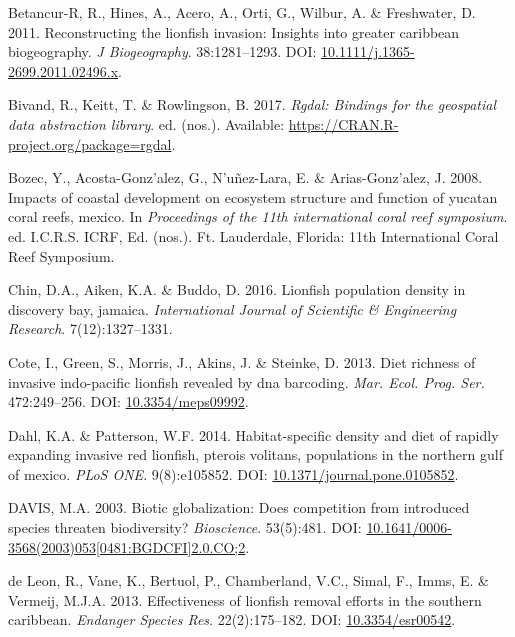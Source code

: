 \documentclass[12pt,]{article}
\begin{document}
\hypertarget{ref-betancurr_2011}{}
Betancur-R, R., Hines, A., Acero, A., Orti, G., Wilbur, A. \&
Freshwater, D. 2011. Reconstructing the lionfish invasion: Insights into
greater caribbean biogeography. \emph{J Biogeography}. 38:1281--1293.
DOI:
\href{https://doi.org/10.1111/j.1365-2699.2011.02496.x}{10.1111/j.1365-2699.2011.02496.x}.

\hypertarget{ref-rgdal_2017}{}
Bivand, R., Keitt, T. \& Rowlingson, B. 2017. \emph{Rgdal: Bindings for
the geospatial data abstraction library}. ed. (nos.). Available:
\url{https://CRAN.R-project.org/package=rgdal}.

\hypertarget{ref-bozec_2008}{}
Bozec, Y., Acosta-Gonz\a'alez, G., N\a'uñez-Lara, E. \&
Arias-Gonz\a'alez, J. 2008. Impacts of coastal development on ecosystem
structure and function of yucatan coral reefs, mexico. In
\emph{Proceedings of the 11th international coral reef symposium}. ed.
I.C.R.S. ICRF, Ed. (nos.). Ft. Lauderdale, Florida: 11th International
Coral Reef Symposium.

\hypertarget{ref-chin_2016}{}
Chin, D.A., Aiken, K.A. \& Buddo, D. 2016. Lionfish population density
in discovery bay, jamaica. \emph{International Journal of Scientific \&
Engineering Research}. 7(12):1327--1331.

\hypertarget{ref-cote_2013}{}
Cote, I., Green, S., Morris, J., Akins, J. \& Steinke, D. 2013. Diet
richness of invasive indo-pacific lionfish revealed by dna barcoding.
\emph{Mar. Ecol. Prog. Ser.} 472:249--256. DOI:
\href{https://doi.org/10.3354/meps09992}{10.3354/meps09992}.

\hypertarget{ref-dahl_2014}{}
Dahl, K.A. \& Patterson, W.F. 2014. Habitat-specific density and diet of
rapidly expanding invasive red lionfish, pterois volitans, populations
in the northern gulf of mexico. \emph{PLoS ONE}. 9(8):e105852. DOI:
\href{https://doi.org/10.1371/journal.pone.0105852}{10.1371/journal.pone.0105852}.

\hypertarget{ref-davis_2003}{}
DAVIS, M.A. 2003. Biotic globalization: Does competition from introduced
species threaten biodiversity? \emph{Bioscience}. 53(5):481. DOI:
\href{https://doi.org/10.1641/0006-3568(2003)053\%5B0481:BGDCFI\%5D2.0.CO;2}{10.1641/0006-3568(2003)053{[}0481:BGDCFI{]}2.0.CO;2}.

\hypertarget{ref-deleon_2013}{}
de Leon, R., Vane, K., Bertuol, P., Chamberland, V.C., Simal, F., Imms,
E. \& Vermeij, M.J.A. 2013. Effectiveness of lionfish removal efforts in
the southern caribbean. \emph{Endanger Species Res}. 22(2):175--182.
DOI: \href{https://doi.org/10.3354/esr00542}{10.3354/esr00542}.
\end{document}
